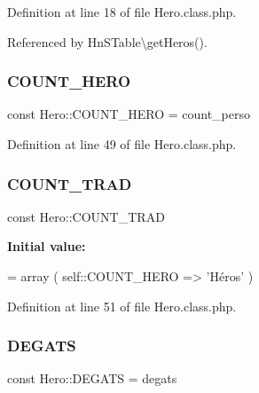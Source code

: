 Definition at line 18 of file Hero.\+class.\+php.



Referenced by Hn\+S\+Table\textbackslash{}get\+Heros().

\mbox{\label{class_hero_afb8b78e6bf7572082037da56ff7b00b5}} 
\subsubsection{\texorpdfstring{C\+O\+U\+N\+T\+\_\+\+H\+E\+RO}{COUNT\_HERO}}
{\footnotesize\ttfamily const Hero\+::\+C\+O\+U\+N\+T\+\_\+\+H\+E\+RO = \textquotesingle{}count\+\_\+perso\textquotesingle{}}



Definition at line 49 of file Hero.\+class.\+php.

\mbox{\label{class_hero_ad67b10f066bfcae5b86bed2a5410f9f6}} 
\subsubsection{\texorpdfstring{C\+O\+U\+N\+T\+\_\+\+T\+R\+AD}{COUNT\_TRAD}}
{\footnotesize\ttfamily const Hero\+::\+C\+O\+U\+N\+T\+\_\+\+T\+R\+AD}

{\bfseries Initial value\+:}
\begin{DoxyCode}
= array (
        self::COUNT\_HERO => \textcolor{stringliteral}{'Héros'}
    )
\end{DoxyCode}


Definition at line 51 of file Hero.\+class.\+php.

\mbox{\label{class_hero_ab1e1334b46c84d771c2f524916be689b}} 
\subsubsection{\texorpdfstring{D\+E\+G\+A\+TS}{DEGATS}}
{\footnotesize\ttfamily const Hero\+::\+D\+E\+G\+A\+TS = \textquotesingle{}degats\textquotesingle{}}



